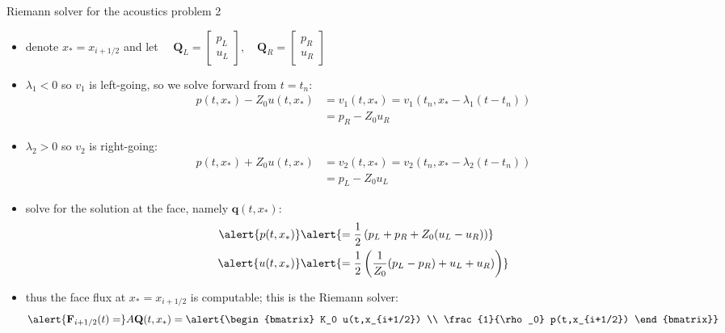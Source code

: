 \documentclass[10pt,dvipsnames,usepdftitle=false,
hyperref={pdftitle = {Finite volume methods},
    pdfauthor = {Ed Bueler}}]{beamer}
\newcommand{\bq}{\mathbf{q}}
\newcommand{\bF}{\mathbf{F}}
\newcommand{\bQ}{\mathbf{Q}}
\begin{document}
\begin{frame}{Riemann solver for the acoustics problem 2}

\begin{itemize}
\item denote $x_*=x_{i+1/2}$ and let $\quad \bQ_L = \begin{bmatrix} p_L \\ u_L \end{bmatrix}, \quad \bQ_R = \begin{bmatrix} p_R \\ u_R \end{bmatrix}$
\item $\lambda_1 < 0$ so $v_1$ is left-going, so we solve forward from $t=t_n$:
\begin{align*}
p(t,x_*) - Z_0 u(t,x_*) &= v_1(t,x_*) = v_1(t_n,x_*-\lambda_1 (t-t_n)) \\
   &= p_R - Z_0 u_R
\end{align*}
\item $\lambda_2 > 0$ so $v_2$ is right-going:
\begin{align*}
p(t,x_*) + Z_0 u(t,x_*) &= v_2(t,x_*) = v_2(t_n,x_*-\lambda_2 (t-t_n)) \\
   &= p_L - Z_0 u_L
\end{align*}
\item solve for the solution at the face, namely $\bq(t,x_*)$:
\begin{align*}
\alert{p(t,x_*)} &\alert{= \frac{1}{2} \left(p_L + p_R + Z_0 (u_L - u_R)\right)} \\
\alert{u(t,x_*)} &\alert{= \frac{1}{2} \left(\frac{1}{Z_0} (p_L - p_R) + u_L + u_R)\right)}
\end{align*}
\item thus the face flux at $x_*=x_{i+1/2}$ is computable; this is the Riemann solver:
    $$\alert{\bF_{i+1/2}(t) =} A \bQ(t,x_*) = \alert{\begin{bmatrix} K_0 u(t,x_{i+1/2}) \\ \frac{1}{\rho_0} p(t,x_{i+1/2}) \end{bmatrix}}$$
\end{itemize}
\end{frame}
\end{document}
